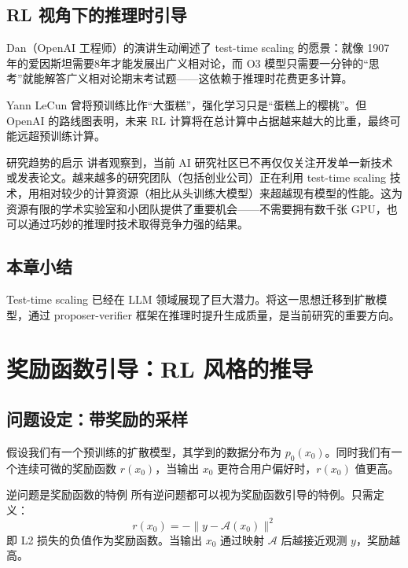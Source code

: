 \documentclass[a4paper]{article}
\begin{document}
\subsection{RL 视角下的推理时引导}

Dan（OpenAI 工程师）的演讲生动阐述了 test-time scaling 的愿景：就像 1907 年的爱因斯坦需要8年才能发展出广义相对论，而 O3 模型只需要一分钟的``思考''就能解答广义相对论期末考试题——这依赖于推理时花费更多计算。

Yann LeCun 曾将预训练比作``大蛋糕''，强化学习只是``蛋糕上的樱桃''。但 OpenAI 的路线图表明，未来 RL 计算将在总计算中占据越来越大的比重，最终可能远超预训练计算。

\begin{warningbox}{研究趋势的启示}
讲者观察到，当前 AI 研究社区已不再仅仅关注开发单一新技术或发表论文。越来越多的研究团队（包括创业公司）正在利用 test-time scaling 技术，用相对较少的计算资源（相比从头训练大模型）来超越现有模型的性能。这为资源有限的学术实验室和小团队提供了重要机会——不需要拥有数千张 GPU，也可以通过巧妙的推理时技术取得竞争力强的结果。
\end{warningbox}

\subsection{本章小结}

Test-time scaling 已经在 LLM 领域展现了巨大潜力。将这一思想迁移到扩散模型，通过 proposer-verifier 框架在推理时提升生成质量，是当前研究的重要方向。

\section{奖励函数引导：RL 风格的推导}

\subsection{问题设定：带奖励的采样}

假设我们有一个预训练的扩散模型，其学到的数据分布为 $p_0(x_0)$。同时我们有一个连续可微的奖励函数 $r(x_0)$，当输出 $x_0$ 更符合用户偏好时，$r(x_0)$ 值更高。

\begin{importantbox}{逆问题是奖励函数的特例}
所有逆问题都可以视为奖励函数引导的特例。只需定义：
$$r(x_0) = -\| y - \mathcal{A}(x_0) \|^2$$
即 L2 损失的负值作为奖励函数。当输出 $x_0$ 通过映射 $\mathcal{A}$ 后越接近观测 $y$，奖励越高。
\end{importantbox}
\end{document}
